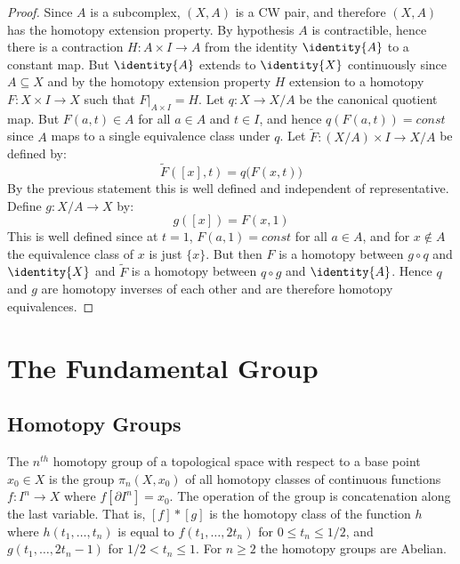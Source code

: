 \documentclass{book}                                                           %
\begin{document}
                \begin{proof}
                    Since $A$ is a subcomplex, $(X,A)$ is a CW pair, and
                    therefore $(X,A)$ has the homotopy extension property. By
                    hypothesis $A$ is contractible, hence there is a contraction
                    $H:A\times{I}\rightarrow{A}$ from the identity
                    $\identity{A}$ to a constant map. But $\identity{A}$ extends
                    to $\identity{X}$ continuously since $A\subseteq{X}$ and
                    by the homotopy extension property $H$ extension to a
                    homotopy $F:X\times{I}\rightarrow{X}$ such that
                    $F|_{A\times{I}}=H$. Let $q:X\rightarrow{X}/A$ be the
                    canonical quotient map. But $F(a,t)\in{A}$ for all $a\in{A}$
                    and $t\in{I}$, and hence $q(F(a,t))=const$ since $A$ maps to
                    a single equivalence class under $q$. Let
                    $\tilde{F}:(X/A)\times{I}\rightarrow{X}/A$ be defined by:
                    \begin{equation}
                        \tilde{F}([x],t)=q\big(F(x,t)\big)
                    \end{equation}
                    By the previous statement this is well defined and
                    independent of representative. Define $g:X/A\rightarrow{X}$
                    by:
                    \begin{equation}
                        g([x])=F(x,1)
                    \end{equation}
                    This is well defined since at $t=1$, $F(a,1)=const$ for all
                    $a\in{A}$, and for $x\notin{A}$ the equivalence class of $x$
                    is just $\{x\}$. But then $F$ is a homotopy between
                    $g\circ{q}$ and $\identity{X}$ and $\tilde{F}$ is a homotopy
                    between $q\circ{g}$ and $\identity{A}$. Hence $q$ and $g$
                    are homotopy inverses of each other and are therefore
                    homotopy equivalences.
                \end{proof}
    \chapter{The Fundamental Group}
        \section{Homotopy Groups}
            The $n^{th}$ homotopy group of a topological space with respect to a
            base point $x_{0}\in{X}$ is the group $\pi_{n}(X,x_{0})$ of all
            homotopy classes of continuous functions $f:I^{n}\rightarrow{X}$
            where $f[\partial{I}^{n}]=x_{0}$. The operation of the group is
            concatenation along the last variable. That is,
            $[f]*[g]$ is the homotopy class of the function
            $h$ where $h(t_{1},\dots,t_{n})$ is equal to
            $f(t_{1},\dots,2t_{n})$ for $0\leq{t}_{n}\leq{1}/2$, and
            $g(t_{1},\dots,2t_{n}-1)$ for $1/2<t_{n}\leq{1}$. For $n\geq{2}$ the
            homotopy groups are Abelian.
\end{document}
